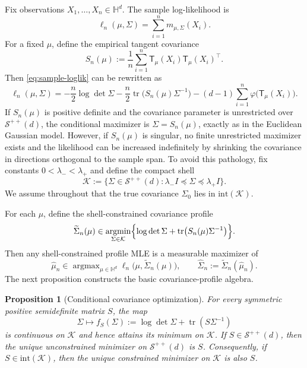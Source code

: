 \documentclass[11pt]{article}
\newtheorem{proposition}[theorem]{Proposition}
\DeclareMathOperator{\tr}{tr}
\DeclareMathOperator{\argmax}{argmax}
\DeclareMathOperator{\argmin}{argmin}
\newcommand{\Hh}{\mathbb{H}}
\newcommand{\SPD}{\mathcal{S}^{++}}
\newcommand{\Id}{I}
\newcommand{\shell}{\mathcal{K}}
\newcommand{\psiwrap}{\varphi}
\newcommand{\T}{\mathsf{T}}
\begin{document}
Fix observations $X_1,\dots,X_n\in\Hh^d$. The sample log-likelihood is
\begin{equation}
\label{eq:sample-loglik}
\ell_n(\mu,\Sigma)=\sum_{i=1}^n m_{\mu,\Sigma}(X_i).
\end{equation}
For a fixed $\mu$, define the empirical tangent covariance
\begin{equation}
\label{eq:Sn}
S_n(\mu):=\frac1n\sum_{i=1}^n \T_\mu(X_i)\T_\mu(X_i)^\top.
\end{equation}
Then \eqref{eq:sample-loglik} can be rewritten as
\begin{equation}
\label{eq:sample-loglik2}
\ell_n(\mu,\Sigma)
=
-\frac n2\log\det\Sigma
-\frac n2\tr\bigl(S_n(\mu)\Sigma^{-1}\bigr)
-(d-1)\sum_{i=1}^n \psiwrap\bigl(\T_\mu(X_i)\bigr).
\end{equation}
If $S_n(\mu)$ is positive definite and the covariance parameter is unrestricted over $\SPD(d)$, the conditional maximizer is $\Sigma=S_n(\mu)$, exactly as in the Euclidean Gaussian model. However, if $S_n(\mu)$ is singular, no finite unrestricted maximizer exists and the likelihood can be increased indefinitely by shrinking the covariance in directions orthogonal to the sample span. To avoid this pathology, fix constants $0<\lambda_-<\lambda_+$ and define the compact shell
\begin{equation}
\label{eq:shell}
\shell:=\{\Sigma\in\SPD(d):\lambda_-\Id\preceq\Sigma\preceq\lambda_+\Id\}.
\end{equation}
We assume throughout that the true covariance $\Sigma_0$ lies in $\mathrm{int}(\shell)$.

For each $\mu$, define the shell-constrained covariance profile
\begin{equation}
\label{eq:sigma-profile}
\widetilde\Sigma_n(\mu)\in
\argmin_{\Sigma\in\shell}
\Bigl\{\log\det\Sigma+\tr\bigl(S_n(\mu)\Sigma^{-1}\bigr)\Bigr\}.
\end{equation}
Then any shell-constrained profile MLE is a measurable maximizer of
\begin{equation}
\label{eq:mu-profile-est}
\hat\mu_n\in \argmax_{\mu\in\Hh^d}\ell_n\bigl(\mu,\widetilde\Sigma_n(\mu)\bigr),
\qquad
\hat\Sigma_n:=\widetilde\Sigma_n(\hat\mu_n).
\end{equation}
The next proposition constructs the basic covariance-profile algebra.

\begin{proposition}[Conditional covariance optimization]
\label{prop:conditionalSigma}
For every symmetric positive semidefinite matrix $S$, the map
\[
\Sigma\mapsto f_S(\Sigma):=\log\det\Sigma+\tr(S\Sigma^{-1})
\]
is continuous on $\shell$ and hence attains its minimum on $\shell$. If $S\in\SPD(d)$, then the unique unconstrained minimizer on $\SPD(d)$ is $S$. Consequently, if $S\in \mathrm{int}(\shell)$, then the unique constrained minimizer on $\shell$ is also $S$.
\end{proposition}
\end{document}
